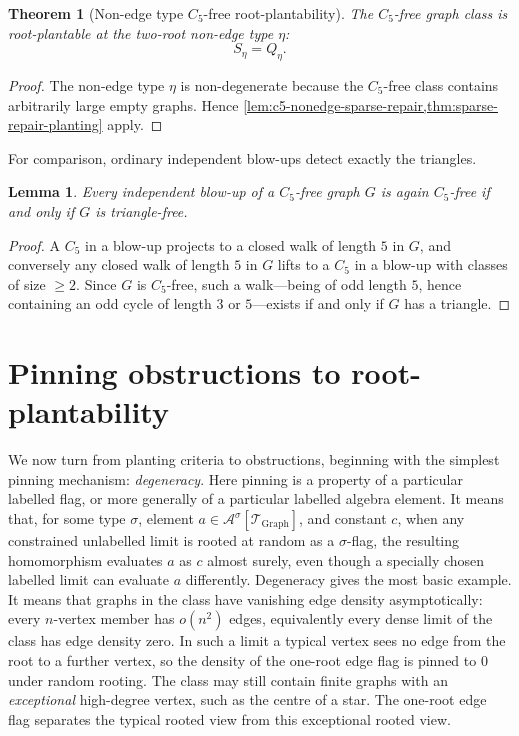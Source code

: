 \documentclass[11pt]{article}
\newtheorem{theorem}{Theorem}
\newtheorem{lemma}[lemma]{Lemma}
\theoremstyle{definition}
\newcommand{\A}{\mathcal{A}}
\newcommand{\T}{\mathcal{T}}
\begin{document}
\begin{theorem}[Non-edge type $C_5$-free root-plantability]\label{thm:c5-nonedge-root}
The $C_5$-free graph class is root-plantable at the two-root non-edge type
$\eta$:
\[
  S_\eta=Q_\eta.
\]
\end{theorem}

\begin{proof}
The non-edge type $\eta$ is non-degenerate because the $C_5$-free class contains
arbitrarily large empty graphs.  Hence
\cref{lem:c5-nonedge-sparse-repair,thm:sparse-repair-planting} apply.
\end{proof}

For comparison, ordinary independent blow-ups detect exactly the triangles.

\begin{lemma}\label{lem:c5-blowup}
Every independent blow-up of a $C_5$-free graph $G$ is again $C_5$-free if and only
if $G$ is triangle-free.
\end{lemma}

\begin{proof}
A $C_5$ in a blow-up projects to a closed walk of length $5$ in $G$, and conversely
any closed walk of length $5$ in $G$ lifts to a $C_5$ in a blow-up with classes of
size $\ge2$.  Since $G$ is $C_5$-free, such a walk---being of odd length $5$, hence
containing an odd cycle of length $3$ or $5$---exists if and only if $G$ has a
triangle.
\end{proof}

\section{Pinning obstructions to root-plantability}

We now turn from planting criteria to obstructions, beginning with the simplest
pinning mechanism: \emph{degeneracy}.  Here pinning is a property of a
particular labelled flag, or more generally of a particular labelled algebra
element.  It means that, for some type
\(\sigma\), element \(a\in\A^\sigma[\T_{\mathrm{Graph}}]\), and constant \(c\),
when any constrained unlabelled limit is rooted at random as a \(\sigma\)-flag,
the resulting homomorphism evaluates \(a\) as \(c\) almost surely,
even though a specially chosen labelled limit can evaluate \(a\) differently.
Degeneracy gives the most basic example.  It means
that graphs in the class have vanishing edge density asymptotically: every
$n$-vertex member has $o(n^2)$ edges, equivalently every dense limit of the
class has edge density zero.  In such a limit a typical vertex sees no
edge from the root to a further vertex, so the density of the one-root edge flag is pinned to \(0\)
under random rooting.  The class may still contain finite graphs with an
\emph{exceptional} high-degree vertex, such as the centre of a star.  The one-root edge flag
separates the typical rooted view from this exceptional rooted view.
\end{document}
